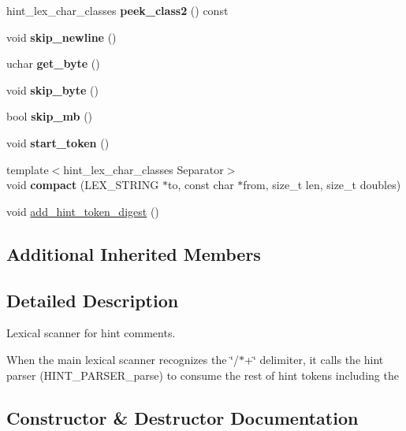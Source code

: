 \begin{DoxyCompactItemize}
hint\+\_\+lex\+\_\+char\+\_\+classes {\bfseries peek\+\_\+class2} () const
\item 
\mbox{\label{classHint__scanner_a9d2f0703b54113d866651b93837bb10c}} 
void {\bfseries skip\+\_\+newline} ()
\item 
\mbox{\label{classHint__scanner_a6af9de2c5e708704687e66eac99ae8d4}} 
uchar {\bfseries get\+\_\+byte} ()
\item 
\mbox{\label{classHint__scanner_a5a33e817c80d080cd055174e5307db1c}} 
void {\bfseries skip\+\_\+byte} ()
\item 
\mbox{\label{classHint__scanner_aa46be8b9d4f6e30f6cb1b1b9ae32476e}} 
bool {\bfseries skip\+\_\+mb} ()
\item 
\mbox{\label{classHint__scanner_adcf347240d2461bbbc5a781c881c9e5a}} 
void {\bfseries start\+\_\+token} ()
\item 
\mbox{\label{classHint__scanner_a3c9142ad70ffede3595ccba3cc6c2dc9}} 
{\footnotesize template$<$hint\+\_\+lex\+\_\+char\+\_\+classes Separator$>$ }\\void {\bfseries compact} (L\+E\+X\+\_\+\+S\+T\+R\+I\+NG $\ast$to, const char $\ast$from, size\+\_\+t len, size\+\_\+t doubles)
\item 
void \mbox{\hyperlink{classHint__scanner_ae152151a300af4a824c01ef38f271382}{add\+\_\+hint\+\_\+token\+\_\+digest}} ()
\end{DoxyCompactItemize}
\subsection*{Additional Inherited Members}


\subsection{Detailed Description}
Lexical scanner for hint comments.

When the main lexical scanner recognizes the \char`\"{}/$\ast$+\char`\"{} delimiter, it calls the hint parser (H\+I\+N\+T\+\_\+\+P\+A\+R\+S\+E\+R\+\_\+parse) to consume the rest of hint tokens including the 

\subsection{Constructor \& Destructor Documentation}
\mbox{\label{classHint__scanner_a0fc7dc3dff1f3e65d8c744cbb39134af}} 
